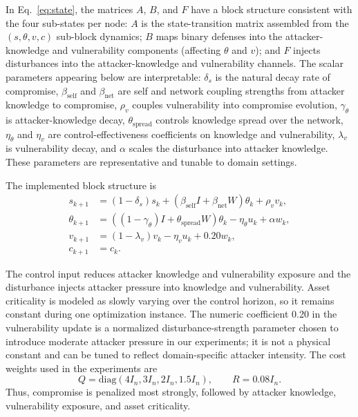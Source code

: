 \documentclass[runningheads]{llncs}
\begin{document}
In Eq.~\eqref{eq:state}, the matrices $A$, $B$, and $F$ have a block structure consistent with the four sub-states per node: $A$ is the state-transition matrix assembled from the $(s,\theta,v,c)$ sub-block dynamics; $B$ maps binary defenses into the attacker-knowledge and vulnerability components (affecting $\theta$ and $v$); and $F$ injects disturbances into the attacker-knowledge and vulnerability channels. The scalar parameters appearing below are interpretable: $\delta_s$ is the natural decay rate of compromise, $\beta_{\mathrm{self}}$ and $\beta_{\mathrm{net}}$ are self and network coupling strengths from attacker knowledge to compromise, $\rho_v$ couples vulnerability into compromise evolution, $\gamma_\theta$ is attacker-knowledge decay, $\theta_{\mathrm{spread}}$ controls knowledge spread over the network, $\eta_\theta$ and $\eta_v$ are control-effectiveness coefficients on knowledge and vulnerability, $\lambda_v$ is vulnerability decay, and $\alpha$ scales the disturbance into attacker knowledge. These parameters are representative and tunable to domain settings.

The implemented block structure is
\begin{align}
s_{k+1} &=
(1-\delta_s)s_k +
(\beta_{\mathrm{self}}I+\beta_{\mathrm{net}}W)\theta_k +
\rho_v v_k, \\
\theta_{k+1} &=
\left((1-\gamma_\theta)I+\theta_{\mathrm{spread}}W\right)\theta_k
-\eta_\theta u_k+\alpha w_k, \\
v_{k+1} &=
(1-\lambda_v)v_k-\eta_v u_k+0.20w_k, \\
c_{k+1} &= c_k.
\end{align}

The control input reduces attacker knowledge and vulnerability exposure and the disturbance injects attacker pressure into knowledge and vulnerability. Asset criticality is modeled as slowly varying over the control horizon, so it remains constant during one optimization instance. The numeric coefficient 0.20 in the vulnerability update is a normalized disturbance-strength parameter chosen to introduce moderate attacker pressure in our experiments; it is not a physical constant and can be tuned to reflect domain-specific attacker intensity. The cost weights used in the experiments are
\begin{equation}
Q=\mathrm{diag}(4I_n,3I_n,2I_n,1.5I_n), \qquad R=0.08I_n.
\end{equation}
Thus, compromise is penalized most strongly, followed by attacker knowledge, vulnerability exposure, and asset criticality.
\end{document}
